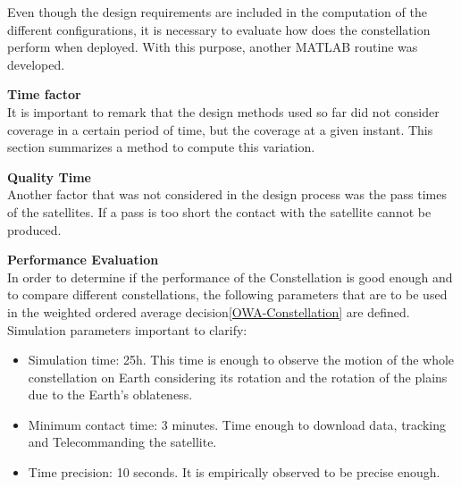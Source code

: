 Even though the design requirements are included in the computation of the different configurations, it is necessary to evaluate how does the constellation perform when deployed. With this purpose, another MATLAB routine was developed. 

\textbf{Time factor\\}
It is important to remark that the design methods used so far did not consider coverage in a certain period of time, but the coverage at a given instant. This section summarizes a method to compute this variation.

\textbf{Quality Time\\}
Another factor that was not considered in the design process was the pass times of the satellites. If a pass is too short the contact with the satellite cannot be produced. 

\textbf{Performance Evaluation\\}
In order to determine if the performance of the Constellation is good enough and to compare different constellations, the following parameters that are to be used in the weighted ordered average decision\ref{OWA-Constellation} are defined.\\
\newline
Simulation parameters important to clarify:
\begin{itemize}
\item Simulation time: 25h. This time is enough to observe the motion of the whole constellation on Earth considering its rotation and the rotation of the plains due to the Earth's oblateness.
\item Minimum contact time: 3 minutes. Time enough to download data, tracking and Telecommanding the satellite.
\item Time precision: 10 seconds. It is empirically observed to be precise enough.
\end{itemize}

